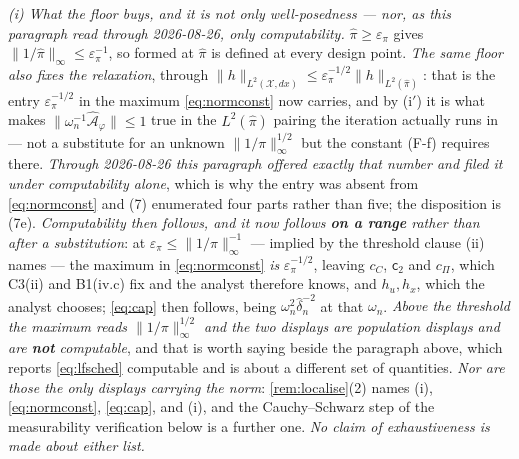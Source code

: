 \emph{(i) What the floor buys, and it is not only well-posedness --- nor, as this paragraph read
through 2026-08-26, only computability.} $\hat\pi\ge\varepsilon_\pi$ gives
$\|1/\hat\pi\|_\infty\le\varepsilon_\pi^{-1}$, so  formed at $\hat\pi$ is defined at
every design point. \emph{The same floor also fixes the relaxation}, through
$\|h\|_{L^{2}(\mathcal X,dx)}\le\varepsilon_\pi^{-1/2}\|h\|_{L^{2}(\hat\pi)}$: that is the entry
$\varepsilon_\pi^{-1/2}$ in the maximum \eqref{eq:normconst} now carries, and by
\textup{(i$'$)} it is what makes
$\|\omega_n^{-1}\hat{\mathcal A}_\varphi\|\le1$ true in the $L^{2}(\hat\pi)$ pairing the iteration
actually runs in --- not a substitute for an unknown $\|1/\pi\|_\infty^{1/2}$ but the constant
\textup{(F-f)} requires there. \emph{Through 2026-08-26 this paragraph offered exactly that number and
filed it under computability alone}, which is why the entry was absent from \eqref{eq:normconst} and
\textup{(7)} enumerated four parts rather than five; the disposition is
\textup{(7e)}.
\emph{Computability then follows, and it now follows \textbf{on a range} rather than after a
substitution}: at $\varepsilon_\pi\le\|1/\pi\|^{-1}_\infty$ --- implied by the threshold clause
\textup{(ii)} names --- the maximum in \eqref{eq:normconst} \emph{is} $\varepsilon_\pi^{-1/2}$, leaving
$c_C$, $\mathsf c_2$ and $c_\Pi$, which C3(ii) and B1(iv.c) fix and the analyst therefore knows, and
$h_u,h_x$, which the analyst chooses; \eqref{eq:cap} then follows, being $\omega_n^{2}\hat\delta_n^{-2}$
at that $\omega_n$. \emph{Above the threshold the maximum reads $\|1/\pi\|_\infty^{1/2}$ and the two
displays are population displays and are \textbf{not} computable}, and that is worth saying beside the
paragraph above, which reports \eqref{eq:lfsched}
computable and is about a different set of quantities. \emph{Nor are those the only displays carrying
the norm}: \cref{rem:localise}\textup{(2)} names \textup{(i)},
\eqref{eq:normconst}, \eqref{eq:cap},  and \textup{(i)}, and
the Cauchy--Schwarz step of the measurability verification below is a further one. \emph{No claim of
exhaustiveness is made about either list.}


